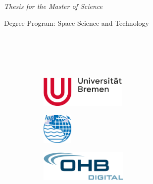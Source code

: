 \begin{titlingpage} %
\thispagestyle{empty} 
\begin{center}
\begin{large}
  \textit{Thesis for the Master of Science}\\
\end{large}
\vspace{1cm}Degree Program: Space Science and Technology\\ \vspace{1cm} 
\vspace{6cm} %
\begin{large} 
\onehalfspacing%
\textbf{\thetitle}\\
\end{large}
\vspace{1.5cm}
\theauthor\\
\vspace{1cm} %
\thedate\\
\vspace{\fill} %

\begin{figure}[!b]
  \begin{subfigure}{0.3\textwidth}
    \includegraphics[height=1.5cm]{img/res/logo.png}
  \end{subfigure} 
  \begin{subfigure}{0.10\textwidth}
    \includegraphics[height=1.5cm]{img/res/logoIUP.png}
  \end{subfigure}\hspace{0.25\textwidth}
  \begin{subfigure}{0.35\textwidth}
    \centering
\includegraphics[height=1.5cm]{img/res/logo_ohb_digital.png}
  \end{subfigure}
\end{figure}

\end{center}
\end{titlingpage}
